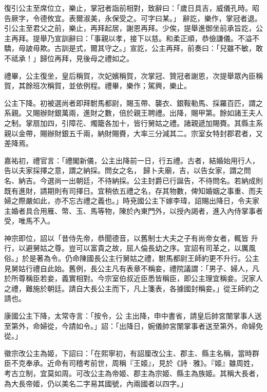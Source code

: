 \begin{pinyinscope}
 復引公主至席位立，樂止，掌冠者詣前相對，致辭曰：「歲日具吉，威儀孔時。昭告厥字，令德攸宜。表爾淑美，永保受之。可字曰某。」
 辭訖，樂作，掌冠者退。引公主至君父之前，樂止，再拜起居，謝恩再拜。少俟，提舉進御坐前承旨訖，公主再拜。提舉乃宣訓辭曰：「事親以孝，接下以慈。和柔正順，恭儉謙儀。不溢不驕，毋詖毋欺。古訓是式，爾其守之。」宣訖，公主再拜，前奏曰：「兒雖不敏，敢不祗承！」歸位再拜，見後母之禮如之。



 禮畢，公主復坐，皇后稱賀，次妃嬪稱賀，次掌冠、贊冠者謝恩，次提舉眾內臣稱賀，其餘班次稱賀，並依例程。禮畢，樂作；駕興，樂止。



 公主下降。初被選尚者即拜駙馬都尉，賜玉帶、襲衣、銀鞍勒馬、採羅百匹，謂之系親。又賜辦財銀萬兩，進財之數，倍於親王聘禮。出降，賜甲第。餘如諸王夫人之制。掌扇加四，引障花、燭籠各加十，皆行舅姑之禮。諸親遞加賜賚。其縣主系親以金帶，賜辦財銀五千兩，納財賜賚，大率三分減其二。宗室女特封郡君者，又差降焉。



 嘉祐初，禮官言：「禮閣新儀，公主出降前一日，行五禮。古者，結婚始用行人，告以夫家採擇之意，謂之納採。問女之名，
 歸卜夫廟，吉，以告女家，謂之問名、納吉。今選尚一出朝廷，不待納採。公主封爵已行誕告，不待問名。若納成則既有進財，請期則有司擇日。宜稍依五禮之名，存其物數，俾知婚姻之事重、而夫婦之際嚴如此，亦不忘古禮之義也。」時兗國公主下嫁李瑋，詔賜出降日，令夫家主婚者具合用雁、幣、玉、馬等物，陳於內東門外，以授內謁者，進入內侍掌事者受，唯馬不入。



 神宗即位，詔以「昔侍先帝，恭聞德音，以舊制士大夫之子有尚帝女者，輒皆
 升行，以避舅姑之尊。豈可以富貴之故，屈人倫長幼之序。宜詔有司革之，以厲風俗。」於是著為令。仍命陳國長公主行舅姑之禮，駙馬都尉王師約更不升行。公主見舅姑行禮自此始。舊例，長公主凡有表章不稱妾，禮院議謂：「男子、婦人，凡於所尊稱臣若妾，義實相對。今宗室伯叔近臣悉皆稱臣，即公主理宜稱妾。況家人之禮，難施於朝廷。請自大長公主而下，凡上箋表，各據國封稱妾。」從王師約之請也。



 康國公主下降，太常寺言：「按令，公
 主出降，申中書省，請皇后帥宮闈掌事人送至第外，命婦從，今請如令。」詔：「出降日，婉儀帥宮闈掌事者送至第外，命婦免從。」



 徽宗改公主為姬，下詔曰：「在熙寧初，有詔厘改公主、郡主、縣主名稱，當時群臣不克奉承。近命有司稽考前世，周稱『王姬』，見於《詩·雅》。『姬』雖周姓，考古立制，宜莫如周。可改公主為帝姬、郡主為宗姬、縣主為族姬。其稱大長者，為大長帝姬，仍以美名二字易其國號，內兩國者以四字。」




\end{pinyinscope}
